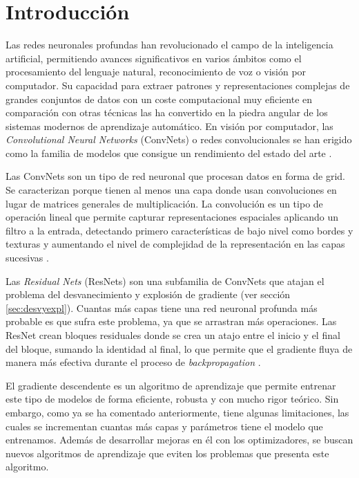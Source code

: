 \section{Introducción}

Las redes neuronales profundas han revolucionado el campo de la inteligencia artificial, permitiendo avances significativos en varios ámbitos como el procesamiento del lenguaje natural, reconocimiento de voz o visión por computador. Su capacidad para extraer patrones y representaciones complejas de grandes conjuntos de datos con un coste computacional muy eficiente en comparación con otras técnicas las ha convertido en la piedra angular de los sistemas modernos de aprendizaje automático. En visión por computador, las \textit{Convolutional Neural Networks} (ConvNets) o redes convolucionales se han erigido como la familia de modelos que consigue un rendimiento del estado del arte \cite{GoodFellowBook}.

Las ConvNets son un tipo de red neuronal que procesan datos en forma de grid. Se caracterizan porque tienen al menos una capa donde usan convoluciones en lugar de matrices generales de multiplicación. La convolución es un tipo de operación lineal que permite capturar representaciones espaciales aplicando un filtro a la entrada, detectando primero características de bajo nivel como bordes y texturas y aumentando el nivel de complejidad de la representación en las capas sucesivas \cite{GoodFellowBook}.

Las \textit{Residual Nets} (ResNets) son una subfamilia de ConvNets que atajan el problema del desvanecimiento y explosión de gradiente (ver sección \ref{sec:desvyexpl}). Cuantas más capas tiene una red neuronal profunda más probable es que sufra este problema, ya que se arrastran más operaciones. Las ResNet crean bloques residuales donde se crea un atajo entre el inicio y el final del bloque, sumando la identidad al final, lo que permite que el gradiente fluya de manera más efectiva durante el proceso de \textit{backpropagation} \cite{ResNets}.

El gradiente descendente es un algoritmo de aprendizaje que permite entrenar este tipo de modelos de forma eficiente, robusta y con mucho rigor teórico. Sin embargo, como ya se ha comentado anteriormente, tiene algunas limitaciones, las cuales se incrementan cuantas más capas y parámetros tiene el modelo que entrenamos. Además de desarrollar mejoras en él con los optimizadores, se buscan nuevos algoritmos de aprendizaje que eviten los problemas que presenta este algoritmo.

